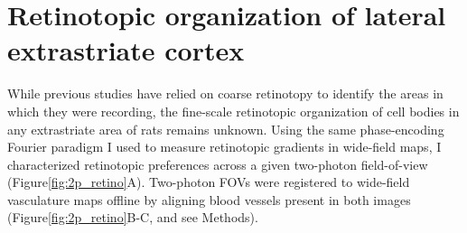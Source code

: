 
\section{Retinotopic organization of lateral extrastriate cortex}
While previous studies have relied on coarse retinotopy to identify the areas in which they were recording, the fine-scale retinotopic organization of cell bodies in any extrastriate area of rats remains unknown. Using the same phase-encoding Fourier paradigm I used to measure retinotopic gradients in wide-field maps, I characterized retinotopic preferences across a given two-photon field-of-view (Figure\ref{fig:2p_retino}A). Two-photon FOVs were registered to wide-field vasculature maps offline by aligning blood vessels present in both images (Figure\ref{fig:2p_retino}B-C, and see Methods). 

